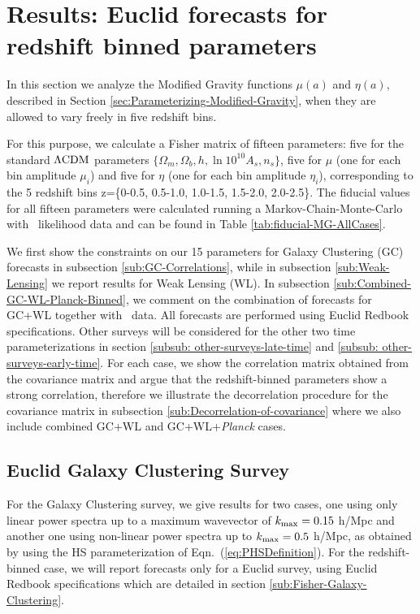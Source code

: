 \section{\label{sec:Results:-Redshift-Binned}Results: Euclid forecasts for redshift binned parameters}
In this section we analyze the Modified Gravity functions $\mu(a)$ and $\eta(a)$,
described in Section \ref{sec:Parameterizing-Modified-Gravity}, when they are allowed
to vary freely in five redshift bins.

For this purpose, we calculate a Fisher matrix of fifteen parameters:
five for the standard $\Lambda\mathrm{CDM}$ parameters $\{\Omega_{m},\Omega_{b},h,\ln10^{10}A_{s},n_{s}\}$,
five for $\mu$ (one
for each bin amplitude $\mu_{i}$) and five for $\eta$ (one for each
bin amplitude $\eta_{i}$), corresponding to the 5 redshift bins z=\{0-0.5, 0.5-1.0, 1.0-1.5, 1.5-2.0, 2.0-2.5\}. 
The fiducial values for all fifteen parameters
were calculated running a Markov-Chain-Monte-Carlo with \planck\ likelihood
data and can be found in Table \ref{tab:fiducial-MG-AllCases}.

We first show the constraints on our 15 parameters for Galaxy Clustering (GC) forecasts in subsection \ref{sub:GC-Correlations},
while in subsection \ref{sub:Weak-Lensing} we report results for Weak Lensing (WL). In subsection \ref{sub:Combined-GC-WL-Planck-Binned}, we
comment on the combination of forecasts for GC+WL together with \planck\ data.
All forecasts are performed using Euclid Redbook specifications. 
Other surveys 
will be considered for the other two time parameterizations in section \ref{subsub: other-surveys-late-time} and 
\ref{subsub: other-surveys-early-time}. 
For each case, we show the correlation matrix obtained from the covariance matrix and argue that 
the redshift-binned
parameters show a strong correlation, therefore we illustrate the decorrelation
procedure for the covariance matrix in subsection \ref{sub:Decorrelation-of-covariance}
where we also include combined GC+WL and GC+WL+{\it Planck} cases.



\subsection{\label{sub:GC-Correlations}Euclid Galaxy Clustering Survey}


For the Galaxy Clustering survey, we give results for two cases, one
using only linear power spectra up to a maximum wavevector of $k_{\rm max}=0.15$
h/Mpc and another one using non-linear power spectra up to $k_{\rm max}=0.5$
h/Mpc, as obtained by using the HS parameterization of
Eqn.\ (\ref{eq:PHSDefinition}).
For the redshift-binned case, we will report forecasts only for a Euclid survey, 
using Euclid Redbook specifications which
are detailed in section \ref{sub:Fisher-Galaxy-Clustering}.

